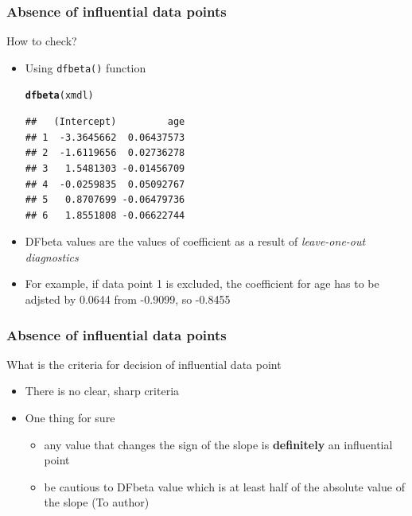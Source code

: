 \documentclass[10p]{beamer}\usepackage[]{graphicx}\usepackage[]{color}
\makeatletter
\newcommand{\hlstd}[1]{\textcolor[rgb]{0.345,0.345,0.345}{#1}}%
\newcommand{\hlkwd}[1]{\textcolor[rgb]{0.737,0.353,0.396}{\textbf{#1}}}%
\newenvironment{kframe}{%
 \def\at@end@of@kframe{}%
 \ifinner\ifhmode%
  \def\at@end@of@kframe{\end{minipage}}%
  \begin{minipage}{\columnwidth}%
 \fi\fi%
 \def\FrameCommand##1{\hskip\@totalleftmargin \hskip-\fboxsep
 \colorbox{shadecolor}{##1}\hskip-\fboxsep
     \hskip-\linewidth \hskip-\@totalleftmargin \hskip\columnwidth}%
 \MakeFramed {\advance\hsize-\width
   \@totalleftmargin\z@ \linewidth\hsize
   \@setminipage}}%
 {\par\unskip\endMakeFramed%
 \at@end@of@kframe}
\newenvironment{knitrout}{}{} %
\makeatother
\begin{document}
\begin{frame}[fragile]
\frametitle{Absence of influential data points}
How to check?
\begin{itemize}
\item Using \texttt{dfbeta()} function
\begin{knitrout}\scriptsize
{}\color{fgcolor}\begin{kframe}
\begin{alltt}
\hlkwd{dfbeta}\hlstd{(xmdl)}
\end{alltt}
\begin{verbatim}
##   (Intercept)         age
## 1  -3.3645662  0.06437573
## 2  -1.6119656  0.02736278
## 3   1.5481303 -0.01456709
## 4  -0.0259835  0.05092767
## 5   0.8707699 -0.06479736
## 6   1.8551808 -0.06622744
\end{verbatim}
\end{kframe}
\end{knitrout}
\item DFbeta values are the values of coefficient as a result of \textit{leave-one-out diagnostics}
\item For example, if data point 1 is excluded, the coefficient for age has to be adjsted by 0.0644 from -0.9099, so -0.8455
\end{itemize}
\end{frame}

\begin{frame}
\frametitle{Absence of influential data points}
What is the criteria for decision of influential data point
\begin{itemize}
\item There is no clear, sharp criteria
\item One thing for sure
	\begin{itemize}
	\item any value that changes the sign of the slope is \textbf{definitely} an influential point
	\item be cautious to DFbeta value which is at least half of the absolute value of the slope (To author)
	\end{itemize}
\end{itemize}
\end{frame}
\end{document}
